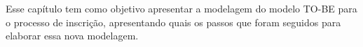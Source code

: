 Esse capítulo tem como objetivo apresentar a modelagem do modelo TO-BE para o processo de inscrição, apresentando quais os passos que foram seguidos para elaborar essa nova modelagem.